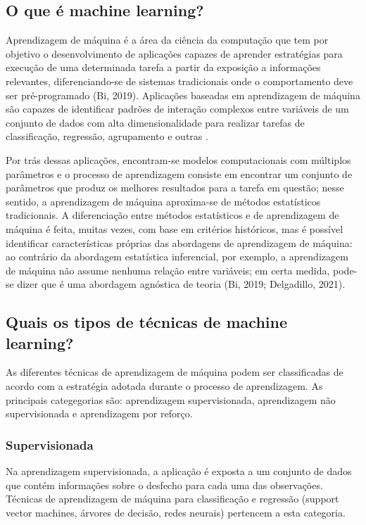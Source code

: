 \subsection{O que é machine learning?}

Aprendizagem de máquina é a área da ciência da computação que tem por objetivo o desenvolvimento
de aplicações capazes de aprender estratégias para execução de uma determinada tarefa a partir da
exposição a informações relevantes, diferenciando-se de sistemas tradicionais onde o comportamento
deve ser pré-programado (Bi, 2019). Aplicações baseadas em aprendizagem de máquina são capazes de
identificar padrões de interação complexos entre variáveis de um conjunto de dados com alta dimensionalidade
para realizar tarefas de classificação, regressão, agrupamento e outras \cite{Delgadillo2020}.

Por trás dessas aplicações, encontram-se modelos computacionais com múltiplos parâmetros e o processo de
aprendizagem consiste em encontrar um conjunto de parâmetros que produz os melhores resultados para a tarefa
em questão; nesse sentido, a aprendizagem de máquina aproxima-se de métodos estatísticos tradicionais. A diferenciação
entre métodos estatísticos e de aprendizagem de máquina é feita, muitas vezes, com base em critérios históricos,
mas é possível identificar características próprias das abordagens de aprendizagem de máquina: ao contrário da abordagem
estatística inferencial, por exemplo, a aprendizagem de máquina não assume nenhuma relação entre variáveis; em certa medida,
pode-se dizer que é uma abordagem agnóstica de teoria (Bi, 2019; Delgadillo, 2021).

\subsection{Quais os tipos de técnicas de machine learning?}
As diferentes técnicas de aprendizagem de máquina podem ser classificadas de acordo com a estratégia adotada
durante o processo de aprendizagem. As principais categegorias são: aprendizagem supervisionada, aprendizagem não
supervisionada e aprendizagem por reforço.

\subsubsection{Supervisionada}
Na aprendizagem supervisionada, a aplicação é exposta a um conjunto de dados que contém informações sobre o desfecho
para cada uma das observações. Técnicas de aprendizagem de máquina para classificação e regressão (support vector machines,
árvores de decisão, redes neurais) pertencem a esta categoria.


